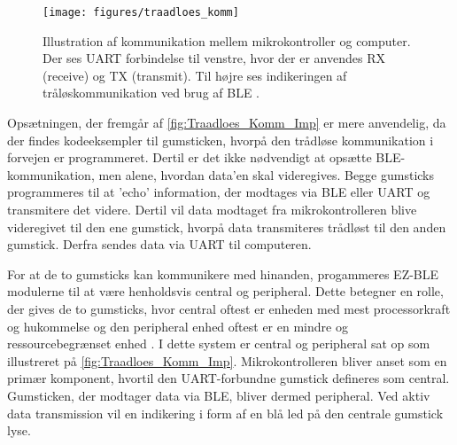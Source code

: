 \begin{figure}[H]
	\centering
	\texttt{[image: figures/traadloes\_komm]}
	\caption{Illustration af kommunikation mellem mikrokontroller og computer. Der ses UART forbindelse til venstre, hvor der er anvendes RX (receive) og TX (transmit). Til højre ses indikeringen af tråløskommunikation ved brug af BLE \citep{cypresspsoc2015, cypresspsoc42015}.} 
	\label{fig:Traadloes_Komm_Imp}
\end{figure}

\noindent
Opsætningen, der fremgår af \autoref{fig:Traadloes_Komm_Imp} er mere anvendelig, da der findes kodeeksempler til gumsticken, hvorpå den trådløse kommunikation i forvejen er programmeret. Dertil er det ikke nødvendigt at opsætte BLE-kommunikation, men alene, hvordan data'en skal videregives. 
Begge gumsticks programmeres til at 'echo' information, der modtages via BLE eller UART og transmitere det videre. Dertil vil data modtaget fra mikrokontrolleren blive videregivet til den ene gumstick, hvorpå data transmiteres trådløst til den anden gumstick. Derfra sendes data via UART til computeren. 

For at de to gumsticks kan kommunikere med hinanden, progammeres EZ-BLE modulerne til at være henholdsvis central og peripheral. Dette betegner en rolle, der gives de to gumsticks, hvor central oftest er enheden med mest processorkraft og hukommelse og den peripheral enhed oftest er en mindre og ressourcebegrænset enhed \citep{townsend2014}. I dette system er central og peripheral sat op som illustreret på \autoref{fig:Traadloes_Komm_Imp}. Mikrokontrolleren bliver anset som en primær komponent, hvortil den UART-forbundne gumstick defineres som central. Gumsticken, der modtager data via BLE, bliver dermed peripheral. Ved aktiv data transmission vil en indikering i form af en blå led på den centrale gumstick lyse.